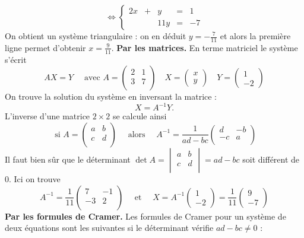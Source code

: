 {\begin{enumerate}
{$$\iff 
\left\{\begin{array}{ccccc}2x & + & y & = & 1\\  &  & 11y & = & -7  \end{array}\right.
$$
On obtient un système triangulaire : on en déduit $y=-\frac{7}{11}$ et alors la première ligne permet d'obtenir
$x=\frac{9}{11}$.
\textbf{Par les matrices.} En terme matriciel le système s'écrit
$$AX=Y \quad \text{  avec } A = \begin{pmatrix} 2 & 1 \\ 3 & 7 \\ \end{pmatrix}
\quad X = \begin{pmatrix} x \\ y \end{pmatrix} \quad Y = \begin{pmatrix} 1 \\ -2 \end{pmatrix}$$
On trouve la solution du système en inversant la matrice :
$$X = A^{-1} Y.$$
L'inverse d'une matrice $2\times 2$ se calcule ainsi
$$\text{ si } A = \begin{pmatrix} a & b \\ c & d \\ \end{pmatrix} \quad \text{ alors } \quad
A^{-1} = \frac{1}{ad-bc}\begin{pmatrix} d & -b \\ -c & a \\ \end{pmatrix}$$
Il faut bien sûr que le déterminant $\det A = \begin{vmatrix}  a & b \\ c & d \\ \end{vmatrix}=ad-bc$ 
soit différent de $0$.
Ici on trouve 
$$A^{-1} = \frac{1}{11}\begin{pmatrix} 7 & -1 \\ -3 & 2 \\ \end{pmatrix} \quad \text{ et } \quad
X = A^{-1} \begin{pmatrix} 1 \\ -2 \end{pmatrix} =  \frac{1}{11}\begin{pmatrix} 9 \\ -7 \end{pmatrix}$$
\textbf{Par les formules de Cramer.}
Les formules de Cramer pour un système de deux équations sont les suivantes si le déterminant vérifie $ad-bc\neq 0$ :
}
\end{enumerate}}
